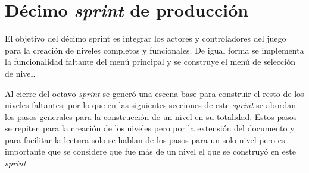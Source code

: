 \section{Décimo \textit{sprint} de producción}
El objetivo del décimo sprint es integrar los actores y controladores del juego 
para la creación de niveles completos y funcionales. De igual forma se 
implementa la funcionalidad faltante del menú principal y se construye el menú 
de selección de nivel.
\\
\par
Al cierre del octavo \textit{sprint} se generó una escena base para construir el 
resto de los niveles faltantes; por lo que en las siguientes secciones de este 
\textit{sprint} se abordan los pasos generales para la construcción de un nivel 
en su totalidad. Estos pasos se repiten para la creación de los niveles pero por 
la extensión del documento y para facilitar la lectura solo se hablan de los 
pasos para un solo nivel pero es importante que se considere que fue más de un 
nivel el que se construyó en este \textit{sprint}. 

